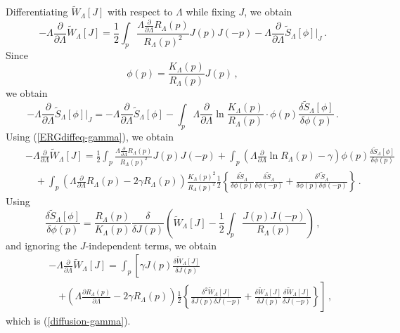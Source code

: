 \documentclass[aps,prd,preprint,groupedaddress,preprintnumbers,longbibliography]{revtex4-1}
\newcommand{\nn}{\nonumber}
\newcommand{\lb}{\left\lbrace}
\newcommand{\rb}{\right\rbrace}
\begin{document}
Differentiating $\tilde{W}_\Lambda [J]$ with respect to $\Lambda$
while fixing $J$, we obtain
\begin{equation}
- \Lambda \frac{\partial}{\partial \Lambda} \tilde{W}_\Lambda [J] = \frac{1}{2}
\int_p \frac{\Lambda \frac{\partial}{\partial \Lambda} R_\Lambda
  (p)}{R_\Lambda (p)^2} J(p) J(-p) - \Lambda \frac{\partial}{\partial
  \Lambda} \tilde{S}_\Lambda [\phi]\Big|_J\,.
\end{equation}
Since
\begin{equation}
\phi (p) = \frac{K_\Lambda (p)}{R_\Lambda (p)} J (p)\,,
\end{equation}
we obtain
\begin{equation}
- \Lambda \frac{\partial}{\partial \Lambda} \tilde{S}_\Lambda [\phi]\Big|_J
= - \Lambda \frac{\partial}{\partial \Lambda} \tilde{S}_\Lambda [\phi] - \int_p
\Lambda \frac{\partial}{\partial \Lambda} \ln \frac{K_\Lambda
  (p)}{R_\Lambda (p)} \cdot \phi (p) \frac{\delta \tilde{S}_\Lambda [\phi]}{\delta
  \phi (p)}\,.
\end{equation}
Using (\ref{ERGdiffeq-gamma}), we obtain
\begin{eqnarray}
&&- \Lambda \frac{\partial}{\partial \Lambda} \tilde{W}_\Lambda [J] =
\frac{1}{2} \int_p \frac{\Lambda \frac{\partial}{\partial \Lambda} R_\Lambda
  (p)}{R_\Lambda (p)^2} J(p) J(-p)  + \int_p
\left( \Lambda \frac{\partial}{\partial \Lambda} \ln R_\Lambda (p) -
  \gamma \right) \phi (p) \frac{\delta \tilde{S}_\Lambda [\phi]}{\delta 
  \phi (p)} \nn\\
&&\quad + \int_p \left( \Lambda \frac{\partial}{\partial \Lambda} R_\Lambda
  (p) - 2 \gamma R_\Lambda (p) \right)
\frac{K_\Lambda (p)^2}{R_\Lambda (p)^2} \frac{1}{2} \lb
\frac{\delta \tilde{S}_\Lambda}{\delta \phi (p)} \frac{\delta
  \tilde{S}_\Lambda}{\delta \phi (-p)} 
+ \frac{\delta^2 \tilde{S}_\Lambda}{\delta \phi (p) \delta \phi
  (-p)}\rb\,. 
\end{eqnarray}
Using
\begin{equation}
\frac{\delta \tilde{S}_\Lambda [\phi]}{\delta \phi (p)} =
\frac{R_\Lambda (p)}{K_\Lambda 
  (p)} \frac{\delta}{\delta J(p)} \left( \tilde{W}_\Lambda [J] - \frac{1}{2}
  \int_p \frac{J (p) J(-p)}{R_\Lambda (p)} \right)\,,
\end{equation}
and ignoring the $J$-independent terms, we obtain
\begin{eqnarray}
&&- \Lambda \frac{\partial}{\partial \Lambda} \tilde{W}_\Lambda [J] = \int_p 
\left[ \gamma J(p) \frac{\delta \tilde{W}_\Lambda [J]}{\delta J(p)}
\right.\nn\\
&&\quad\left. +
  \left( \Lambda 
\frac{\partial R_\Lambda (p)}{\partial \Lambda} - 2 \gamma R_\Lambda
(p) \right) \frac{1}{2} \lb \frac{\delta^2 \tilde{W}_\Lambda
[J]}{\delta J(p) \delta J(-p)} + \frac{\delta \tilde{W}_\Lambda
[J]}{\delta J(p)} \frac{\delta \tilde{W}_\Lambda [J]}{\delta J(-p)} \rb
\right] \,,
\end{eqnarray}
which is (\ref{diffusion-gamma}).
\end{document}

